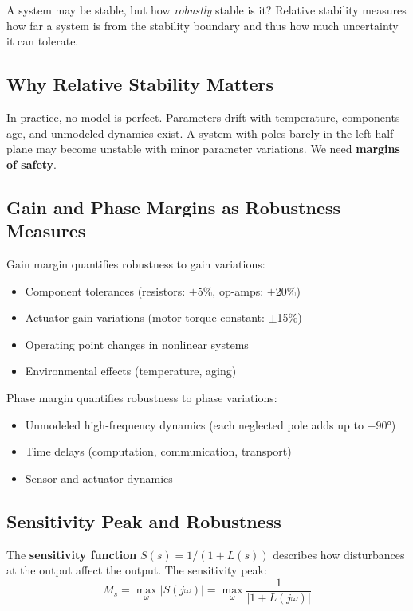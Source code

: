A system may be stable, but how \textit{robustly} stable is it? Relative stability measures how far a system is from the stability boundary and thus how much uncertainty it can tolerate.

\subsection{Why Relative Stability Matters}

In practice, no model is perfect. Parameters drift with temperature, components age, and unmodeled dynamics exist. A system with poles barely in the left half-plane may become unstable with minor parameter variations. We need \textbf{margins of safety}.

\subsection{Gain and Phase Margins as Robustness Measures}

Gain margin quantifies robustness to gain variations:
\begin{itemize}
    \item Component tolerances (resistors: $\pm$5\%, op-amps: $\pm$20\%)
    \item Actuator gain variations (motor torque constant: $\pm$15\%)
    \item Operating point changes in nonlinear systems
    \item Environmental effects (temperature, aging)
\end{itemize}

Phase margin quantifies robustness to phase variations:
\begin{itemize}
    \item Unmodeled high-frequency dynamics (each neglected pole adds up to $-90°$)
    \item Time delays (computation, communication, transport)
    \item Sensor and actuator dynamics
\end{itemize}

\subsection{Sensitivity Peak and Robustness}

The \textbf{sensitivity function} $S(s) = 1/(1 + L(s))$ describes how disturbances at the output affect the output. The sensitivity peak:
\begin{equation}
M_s = \max_{\omega} |S(j\omega)| = \max_{\omega} \frac{1}{|1 + L(j\omega)|}
\end{equation}

